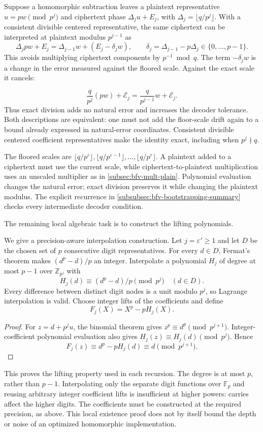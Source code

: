  Suppose a homomorphic subtraction leaves a plaintext representative $u=pw\pmod{p^j}$ and ciphertext phase $\Delta_j u+E_j$, with $\Delta_j=\lfloor q/p^j\rfloor$. With a consistent divisible centered representative, the same ciphertext can be interpreted at plaintext modulus $p^{j-1}$ as
\[
\Delta_jpw+E_j=\Delta_{j-1}w+(E_j-\delta_jw),\qquad
\delta_j=\Delta_{j-1}-p\Delta_j\in\{0,\ldots,p-1\}.
\]
This avoids multiplying ciphertext components by $p^{-1}\bmod q$. The term $-\delta_jw$ is a change in the error measured against the floored scale. Against the exact scale it cancels:

\[
\frac{q}{p^j}(pw)+\mathcal E_j
=\frac{q}{p^{j-1}}w+\mathcal E_j.
\]
Thus exact division adds no natural error and increases the decoder tolerance. Both descriptions are equivalent: one must not add the floor-scale drift again to a bound already expressed in natural-error coordinates. Consistent divisible centered coefficient representatives make the identity exact, including when $p^j\nmid q$.

The floored scales are $\lfloor q/p^\varepsilon\rfloor,\lfloor q/p^{\varepsilon-1}\rfloor,\ldots,\lfloor q/p^r\rfloor$. A plaintext added to a ciphertext must use the current scale, while ciphertext-to-plaintext multiplication uses an unscaled multiplier as in \autoref{subsec:bfv-mult-plain}. Polynomial evaluation changes the natural error; exact division preserves it while changing the plaintext modulus. The explicit recurrence in \autoref{subsubsec:bfv-bootstrapping-summary} checks every intermediate decoder condition.

The remaining local algebraic task is to construct the lifting polynomials.

 We give a precision-aware interpolation construction. Let $j=\varepsilon'\geq1$ and let $D$ be the chosen set of $p$ consecutive digit representatives. For every $d\in D$, Fermat's theorem makes $(d^p-d)/p$ an integer. Interpolate a polynomial $H_j$ of degree at most $p-1$ over $\mathbb Z_{p^j}$ with
\[
H_j(d)\equiv(d^p-d)/p\pmod{p^j}\quad(d\in D).
\]
Every difference between distinct digit nodes is a unit modulo $p^j$, so Lagrange interpolation is valid. Choose integer lifts of the coefficients and define
\[
F_j(X)=X^p-pH_j(X).
\]
\begin{proof}
For $z=d+p^ju$, the binomial theorem gives $z^p\equiv d^p\pmod{p^{j+1}}$. Integer-coefficient polynomial evaluation also gives $H_j(z)\equiv H_j(d)\pmod{p^j}$. Hence
\[
F_j(z)\equiv d^p-pH_j(d)\equiv d\pmod{p^{j+1}}.
\]
\end{proof}
This proves the lifting property used in each recursion. The degree is at most $p$, rather than $p-1$. Interpolating only the separate digit functions over $\mathbb F_p$ and reusing arbitrary integer coefficient lifts is insufficient at higher powers: carries affect the higher digits. The coefficients must be constructed at the required precision, as above. This local existence proof does not by itself bound the depth or noise of an optimized homomorphic implementation.

